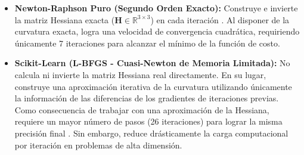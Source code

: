\begin{itemize}
    \item \textbf{Newton-Raphson Puro (Segundo Orden Exacto):} Construye e invierte la matriz Hessiana exacta ($\mathbf{H} \in \mathbb{R}^{3 \times 3}$) en cada iteración . Al disponer de la curvatura exacta, logra una velocidad de convergencia cuadrática, requiriendo únicamente 7 iteraciones para alcanzar el mínimo de la función de costo.
    
    \item \textbf{Scikit-Learn (L-BFGS - Cuasi-Newton de Memoria Limitada):} No calcula ni invierte la matriz Hessiana real directamente. En su lugar, construye una aproximación iterativa de la curvatura utilizando únicamente la información de las diferencias de los gradientes de iteraciones previas. Como consecuencia de trabajar con una aproximación de la Hessiana, requiere un mayor número de pasos (26 iteraciones) para lograr la misma precisión final . Sin embargo, reduce drásticamente la carga computacional por iteración en problemas de alta dimensión.
\end{itemize}

